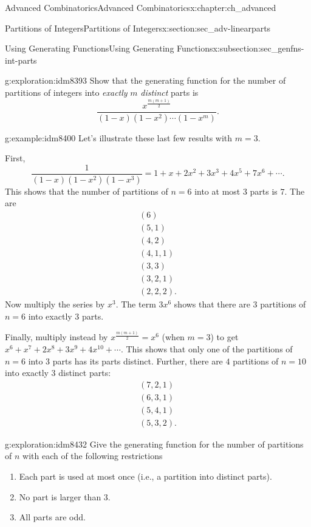 \documentclass[oneside,10pt,]{book}
\numberwithin{equation}{chapter}
\begin{document}
\begin{chapterptx}{Advanced Combinatorics}{}{Advanced Combinatorics}{}{}{x:chapter:ch_advanced}
\begin{sectionptx}{Partitions of Integers}{}{Partitions of Integers}{}{}{x:section:sec_adv-linearparts}
\begin{subsectionptx}{Using Generating Functions}{}{Using Generating Functions}{}{}{x:subsection:sec_genfns-int-parts}
\begin{exploration}{}{g:exploration:idm8393}
Show that the generating function for the number of partitions of integers into \emph{exactly} \(m\) \emph{distinct} parts is%
\begin{equation*}
\frac{x^{\frac{m(m+1)}{2}}}{(1-x)(1-x^2)\cdots(1-x^m)}\text{.}
\end{equation*}
%
\end{exploration}
\begin{example}{}{g:example:idm8400}%
Let's illustrate these last few results with \(m = 3\).%
\par
First,%
\begin{equation*}
\frac{1}{(1-x)(1-x^2)(1-x^3)} = 1 + x + 2x^2 + 3x^3 + 4x^5 + 7x^6 + \cdots\text{.}
\end{equation*}
This shows that the number of partitions of \(n = 6\) into at most 3 parts is \(7\).  The are%
\begin{gather*}
(6) \\
(5,1) \\
(4,2) \\
(4,1,1) \\
(3,3) \\
(3,2,1) \\
(2,2,2) \text{.}
\end{gather*}
Now multiply the series by \(x^3\).  The term \(3x^6\) shows that there are \(3\) partitions of \(n=6\) into exactly 3 parts.%
\par
Finally, multiply instead by \(x^{\frac{m(m+1)}{2}} = x^6\) (when \(m = 3\)) to get \(x^6 + x^7 + 2x^8 + 3x^9+ 4x^{10} + \cdots\).  This shows that only one of the partitions of \(n=6\) into 3 parts has its parts distinct.  Further, there are \(4\) partitions of \(n = 10\) into exactly 3 distinct parts:%
\begin{gather*}
(7,2,1) \\
(6,3,1) \\
(5,4,1) \\
(5,3,2) \text{.}
\end{gather*}
%
\end{example}
\begin{exploration}{}{g:exploration:idm8432}%
Give the generating function for the number of partitions of \(n\) with each of the following restrictions%
\begin{enumerate}[font=\bfseries,label=(\alph*),ref=\alph*]
\item{}Each part is used at most once (i.e., a partition into distinct parts).%
\item{}No part is larger than 3.%
\item{}All parts are odd.%

\end{enumerate}
\end{exploration}
\end{subsectionptx}
\end{sectionptx}
\end{chapterptx}
\end{document}
